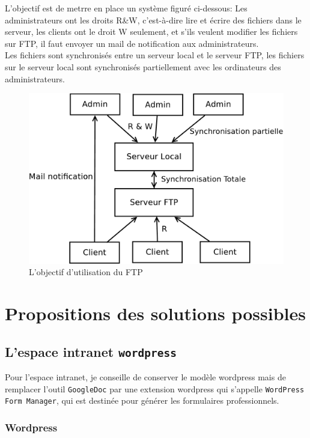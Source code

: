 L'objectif est de metrre en place un système figuré ci-dessous: Les administrateurs ont les droits R\&W, c'est-à-dire lire et écrire des fichiers dans le serveur, les clients ont le droit W seulement, et s'ils veulent modifier les fichiers sur FTP, il faut envoyer un mail de notification aux administrateurs.\\

Les fichiers sont synchronisés entre un serveur local et le serveur FTP, les fichiers sur le serveur local sont synchronisés partiellement avec les ordinateurs des administrateurs.

\begin{figure}[!htbp]
  \centering
    \includegraphics[scale=0.5]{images/FTP}
  \caption{L'objectif d'utilisation du FTP}
\end{figure} 
\section{Propositions des solutions possibles}

  \subsection{L’espace intranet \texttt{wordpress}}
Pour l'espace intranet, je conseille de conserver le modèle wordpress mais de remplacer l'outil \texttt{GoogleDoc} par une extension wordpress qui s'appelle \texttt{WordPress Form Manager}, qui est destinée pour générer les formulaires professionnels.

     \subsubsection{Wordpress}


